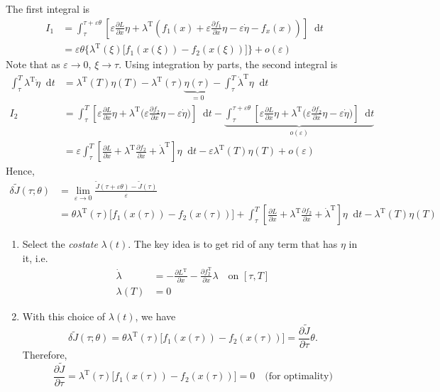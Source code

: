 \documentclass[letterpaper,12pt,titlepage]{report}
\newcommand*\dif{\mathop{}\!\mathrm{d}}
\newcommand{\trans}{^\text{T}}
\newcommand*\pder[2]{\frac{\partial #1}{\partial #2}}
\theoremstyle{plain}
\theoremstyle{definition}
\begin{document}
\noindent
The first integral is
\begin{align}
  I_1 &= \int_\tau^{\tau+\varepsilon\theta} \left[ \varepsilon\pder{L}{x}\eta + \lambda\trans (f_1(x)+\varepsilon\pder{f_1}{x}\eta-\varepsilon\dot\eta-f_x(x)) \right] \dif t \\
      &= \varepsilon\theta \Big\{ \lambda\trans(\xi) \big[ f_1(x(\xi)) - f_2(x(\xi)) \big] \Big\} + o(\varepsilon)
\end{align}
Note that as $\varepsilon\to0$, $\xi\to\tau$. Using integration by parts, the second integral is
\begin{align}
  \int_\tau^T \lambda\trans \dot\eta \dif t &= \lambda\trans(T) \eta(T) - \lambda\trans(\tau) \underbrace{\eta(\tau)}_{=0} - \int_\tau^T \dot\lambda\trans \eta \dif t \\
  I_2 &= \int_\tau^T \left[ \varepsilon\pder{L}{x}\eta + \lambda\trans \Big( \varepsilon\pder{f_2}{x}\eta - \varepsilon\dot\eta \Big) \right] \dif t - \underbrace{ \int_\tau^{\tau+\varepsilon\theta} \left[ \varepsilon\pder{L}{x}\eta + \lambda\trans \Big( \varepsilon\pder{f_2}{x}\eta - \varepsilon\dot\eta \Big) \right] \dif t }_{o(\varepsilon)} \\
                                            &= \varepsilon \int_\tau^T \left[ \pder{L}{x} + \lambda\trans \pder{f_2}{x} + \dot\lambda\trans \right] \eta \dif t - \varepsilon \lambda\trans(T)\eta(T) + o(\varepsilon)
\end{align}
Hence,
\begin{align}
  \delta\tilde J(\tau;\theta) &= \lim_{\varepsilon\to0} \frac{\tilde J(\tau+\varepsilon\theta) - \tilde J(\tau)}{\varepsilon} \\
                              &= \theta\lambda\trans(\tau) \Big[ f_1(x(\tau)) - f_2(x(\tau)) \Big] + \int_\tau^T \left[ \pder{L}{x} + \lambda\trans \pder{f_2}{x} + \dot\lambda\trans \right] \eta \dif t - \lambda\trans(T)\eta(T)
\end{align}

\begin{enumerate}[resume*]
\item Select the \emph{costate} $\lambda(t)$. The key idea is to get rid of any term that has $\eta$ in it, i.e.
  \begin{align}
    \dot\lambda &= -\pder{L\trans}{x} - \pder{f_2\trans}{x} \lambda \quad \text{on } [\tau,T] \\
    \lambda(T) &= 0
  \end{align}
\item With this choice of $\lambda(t)$, we have
  \[ \delta\tilde J(\tau;\theta) = \theta\lambda\trans(\tau) \Big[ f_1(x(\tau)) - f_2(x(\tau)) \Big] = \pder{\tilde J}{\tau} \theta. \]
  Therefore,
  \[ \pder{\tilde J}{\tau} = \lambda\trans(\tau) \Big[ f_1(x(\tau)) - f_2(x(\tau)) \Big] = 0 \quad \text{(for optimality)} \]
\end{enumerate}
\end{document}

